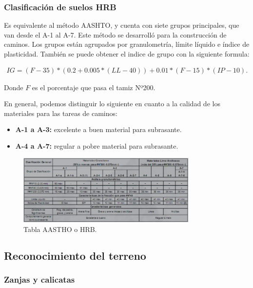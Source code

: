 \documentclass[../main.tex]{subfiles}
\begin{document}
\subsubsection{Clasificación de suelos HRB}

Es equivalente al método AASHTO, y cuenta con siete grupos principales, que van
desde el A-1 al A-7. Este método se desarrolló para la construcción de caminos.
Los grupos están agrupados por granulometría, límite líquido e índice de plasticidad.
También se puede obtener el indice de grupo con la siguiente formula:

\begin{align*}
  IG = (F-35)*(0.2 + 0.005 * (LL - 40)) + 0.01 * (F - 15) * (IP - 10)
.\end{align*}

Donde $F$ es el porcentaje que pasa el tamiz Nº200.

En general, podemos distinguir lo siguiente en cuanto a la calidad de los materiales
para las tareas de caminos:

\begin{itemize}
  \item \textbf{A-1 a A-3:} excelente a buen material para subrasante.
  \item \textbf{A-4 a A-7:} regular a pobre material para subrasante.
\end{itemize}

\begin{figure}[htpb]
  \centering
  \includegraphics[width=0.8\textwidth]{../images/20210422/aashto}
  \caption{Tabla AASTHO o HRB.}
  \label{fig:aastho}
\end{figure}

\subsection{Reconocimiento del terreno}

\subsubsection{Zanjas y calicatas}
\end{document}
